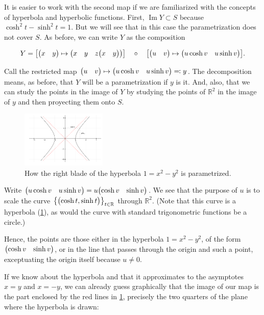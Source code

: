 \documentclass[
    12pt, %
]{fphw}
\DeclareMathOperator{\Ima}{Im}
\newcommand{\R}{\mathbb{R}}
\begin{document}
    It is easier to work with the second map if we are familiarized with
the concepts of hyperbola and hyperbolic functions.
First, $\Ima Y \subset S$ because $\cosh^2 t - \sinh^2 t = 1$.
But we will see that in this case the parametrization does not cover $S$.
As before, we can write $Y$ as the composition

\begin{equation*}
    Y =
    \qty[\mqty(x & y) \mapsto \mqty(x & y & z\mqty(x & y))]
    \quad \circ \quad
    \qty[\mqty(u & v) \mapsto \mqty(u\cosh v & u\sinh v)].
\end{equation*}

\noindent
Call the restricted map
$\mqty(u & v) \mapsto \mqty(u\cosh v & u\sinh v) \eqqcolon y$.
The decomposition means, as before,
that $Y$ will be a parametrization if $y$ is it.
And, also, that we can study the points in the image of $Y$ by
studying the points of $\R^2$ in the image of $y$ and then proyecting them onto $S$.

\begin{figure}
    \centering
    \includegraphics[width=0.36\textwidth]{images/hyperbola.png}
    \caption{How the right blade of the hyperbola $1 = x^2-y^2$ is parametrized.}
    \label{fig:hyperbola}
\end{figure}

    Write $\mqty(u\cosh v & u\sinh v) = u\mqty(\cosh v & \sinh v)$.
We see that the purpose of $u$ is to scale the curve
$\qty{\mqty(\cosh t, \sinh t)}_{t \in \R}$
through $\R^2$.
(Note that this curve is a hyperbola (\cref{fig:hyperbola}),
as would the curve with standard trigonometric functions be a circle.)

    Hence, the points are those either in the hyperbola $1 = x^2-y^2$,
of the form $\mqty(\cosh v & \sinh v)$,
or in the line that passes through the origin and such a point,
exceptuating the origin itself because $u \neq 0$.

    If we know about the hyperbola and that it approximates to the asymptotes
$x = y$ and $x = -y$,
we can already guess graphically that the image of our map is
the part enclosed by the red lines in \cref{fig:hyperbola},
precisely the two quarters of the plane where the hyperbola is drawn:
\end{document}
